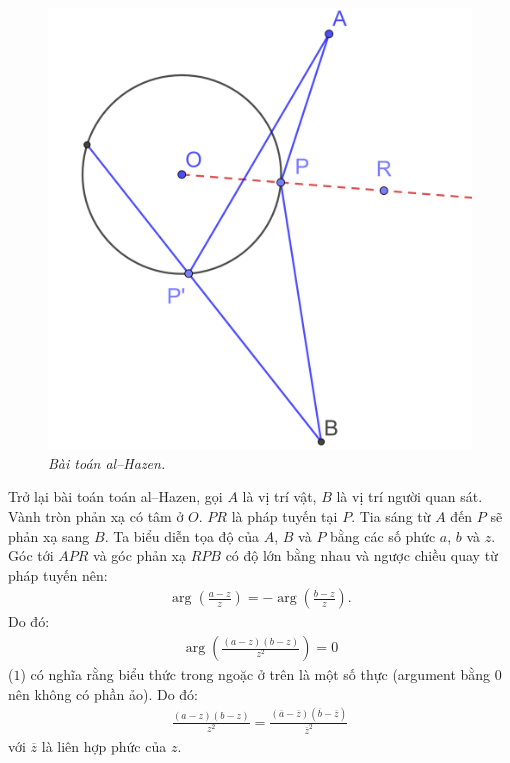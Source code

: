 \begin{multicols}{2}
	\begin{figure}[H]
		\vspace*{-10pt}
		\centering
		\captionsetup{labelformat= empty, justification=centering}
		\includegraphics[width= 0.85\linewidth]{13}
		\caption{\small\textit{\color{lichsutoanhoc}Bài toán al--Hazen.}}
		\vspace*{-10pt}
	\end{figure}
	Trở lại bài toán toán al--Hazen, gọi $A$ là vị trí vật, $B$ là vị trí người quan sát. Vành tròn phản xạ có tâm ở $O$. $PR$ là pháp tuyến tại $P$. Tia sáng từ $A$ đến $P$ sẽ phản xạ sang $B$. Ta biểu diễn tọa độ của $A$, $B$ và $P$ bằng các số phức $a$, $b$ và $z$.
	\vskip 0.1cm
	Góc tới $APR$ và góc phản xạ $RPB$ có độ lớn bằng nhau và ngược chiều quay từ pháp tuyến nên:
	\begin{align*}
		\arg\left(\frac{a-z}{z}\right) = - \arg\left(\frac{b-z}{z}\right).
	\end{align*}
	Do đó:
	\begin{align*}
		\arg\left(\frac{(a-z)(b-z)}{z^2}\right) = 0 \tag{$1$}
	\end{align*}
	($1$) có nghĩa rằng biểu thức trong ngoặc ở trên là một số thực (argument bằng $0$ nên không có phần ảo). Do đó:
	\begin{align*}
		\frac{(a-z)(b-z)}{z^2} = \frac{(\overline{a}- \overline{z})(\overline{b}- \overline{z})}{\overline{z}^2} \tag{$2$}
	\end{align*}
	với $\overline{z}$ là liên hợp phức của $z$.

\end{multicols}
